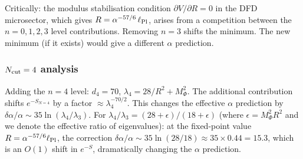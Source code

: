 \documentclass[11pt]{article}
\begin{document}
Critically: the modulus stabilisation condition $\partial V/\partial R = 0$
in the DFD microsector, which gives $R = \alpha^{-57/6}\,\ell_{\rm Pl}$,
arises from a competition between the $n = 0, 1, 2, 3$ level contributions.
Removing $n = 3$ shifts the minimum.  The new minimum (if it exists)
would give a different $\alpha$ prediction.

\subsubsection{$N_{\rm cut} = 4$ analysis}

Adding the $n = 4$ level: $d_4 = 70$, $\lambda_4 = 28/R^2 + M_\Phi^2$.
The additional contribution shifts $e^{-S_{N=4}}$ by a factor $\approx
\lambda_4^{-70/2}$.  This changes the effective $\alpha$ prediction
by $\delta\alpha/\alpha \sim 35\ln(\lambda_4/\lambda_3)$.  For
$\lambda_4/\lambda_3 = (28 + \epsilon)/(18 + \epsilon)$ (where
$\epsilon = M_\Phi^2 R^2$ and we denote the effective ratio of eigenvalues):
at the fixed-point value $R = \alpha^{-57/6}\ell_{\rm Pl}$, the
correction $\delta\alpha/\alpha \sim 35\ln(28/18) \approx 35\times 0.44 = 15.3$,
which is an $O(1)$ shift in $e^{-S}$, dramatically changing the $\alpha$
prediction.
\end{document}
